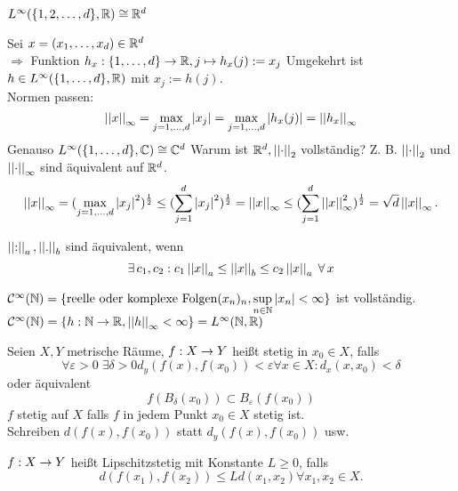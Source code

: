 \documentclass[../ana2.tex]{subfiles}
\begin{document}
\begin{beh}
    \( L^\infty(\{1,2,\dots,d\}, \mathbb{R}) \cong \mathbb{R}^d \)
\end{beh}
\begin{bew}
    Sei \( x = (x_1,\dots,x_d) \in \mathbb{R}^d \) \\
    \( \Rightarrow \) Funktion 
    \( h_x:\{1,\dots,d\}\rightarrow \mathbb{R}, j \mapsto h_x(j) := x_j \)
    Umgekehrt ist \( h \in L^\infty(\{1,\dots,d\}, \mathbb{R}) \)
    mit \( x_j := h(j) \). \\
    Normen passen:
    \[ \left|\left|x\right|\right|_\infty = \underset{j=1,\dots,d}{\max} \left|x_j\right|
    = \underset{j=1,\dots,d}{\max} \left|h_x(j)\right| = \left|\left|h_x\right|\right|_\infty \]
    Genauso \( L^\infty(\{1,\dots,d\}, \mathbb{C}) \cong \mathbb{C}^d \)
    Warum ist \( \mathbb{R}^d, \left|\left|\cdot\right|\right|_2 \) vollständig?
    Z. B. \( \left|\left|\cdot\right|\right|_2 \) und \( \left|\left|\cdot\right|\right|_\infty \) 
    sind äquivalent auf \( \mathbb{R}^d \).
    \[ \left|\left|x\right|\right|_\infty 
    = (\underset{j=1,\ldots,d}{\max} 
    \left|x_j\right|^2 )^{\frac{1}{2}} 
    \leq (\sum_{j=1}^d \left|x_j\right|^2)^{\frac{1}{2}}
    = \left|\left|x\right|\right|_\infty 
    \leq (\sum_{j=1}^d \left|\left|x\right|\right|_\infty^2)^{\frac{1}{2}}
    = \sqrt{d} \left|\left|x\right|\right|_\infty. \]
\end{bew}
\begin{defi*}
    \( \left|\left|:\right|\right|_a, \left|\left|.\right|\right|_b \) sind äquivalent, wenn
    \[ \exists c_1, c_2: c_1\norm{x}_a \leq \norm{x}_b 
    \leq c_2\norm{x}_a \; \forall x \]
\end{defi*}
\begin{bsp}
    \( \mathcal{C}^\infty(\mathbb{N}) 
    = \{\text{reelle oder komplexe Folgen}
    (x_n)_n, \underset{n\in\mathbb{N}}{\sup} \left|x_n\right| < \infty\} \) ist
    vollständig.
    \( \mathcal{C}^\infty(\mathbb{N}) 
    = \{h:\mathbb{N}\rightarrow \mathbb{R}, \left|\left|h\right|\right|_\infty < \infty\}
    = L^\infty(\mathbb{N}, \mathbb{R}) \)
\end{bsp}
\begin{defi}[Stetigkeit]
    Seien \(X, Y \) metrische Räume, \(f:X\rightarrow Y\)
    heißt stetig in \(x_0 \in X\), falls 
    \[ \forall \varepsilon > 0 \; \exists \delta > 0
    d_y(f(x), f(x_0)) < \varepsilon \forall x \in X: 
    d_x(x, x_0) < \delta \]
    oder äquivalent 
    \[ f(B_\delta(x_0)) \subset B_\varepsilon(f(x_0)) \]
    \(f\) stetig auf \(X\) falls \(f\) in jedem Punkt 
    \(x_0 \in X\) stetig ist. \\
    Schreiben \( d(f(x), f(x_0)) \) 
    statt \( d_y(f(x), f(x_0)) \) usw.
\end{defi}    
\begin{defi}[Lipschitzstetig]
    \( f:X\rightarrow Y \) heißt Lipschitzstetig 
    mit Konstante \( L \geq 0 \), falls 
    \[ d(f(x_1), f(x_2)) 
    \leq L d(x_1, x_2) \forall x_1, x_2 \in X. \]
\end{defi}
\end{document}
